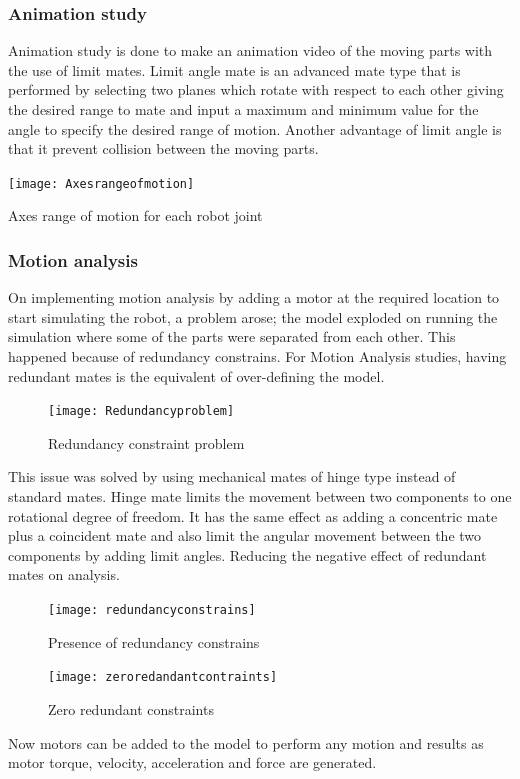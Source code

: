 \bigskip
\subsubsection{Animation study} 
Animation study is done to make an animation video of the moving parts with the use of limit mates. Limit angle mate is an advanced mate type that is performed by selecting two planes which rotate with respect to each other giving the desired range to mate and input a maximum and minimum value for the angle to specify the desired range of motion. Another advantage of limit angle is that it prevent collision between the moving parts.

\begin{table}[H]
	\centering
	\texttt{[image: Axesrangeofmotion]}
	\caption{Axes range of motion for each robot joint}
	\label{table:8}
\end{table}

\bigskip
\subsubsection{Motion analysis}
On implementing motion analysis by adding a motor at the required location to start simulating the robot, a problem arose; the model exploded on running the simulation where some of the parts were separated from each other. This happened because of redundancy constrains. For Motion Analysis studies, having redundant mates is the equivalent of over-defining the model.  

\begin{figure}[H]
	\centering
	\texttt{[image: Redundancyproblem]}
	\caption{Redundancy constraint problem}
\end{figure}

This issue was solved by using mechanical mates of hinge type instead of standard mates. Hinge mate limits the movement between two components to one rotational degree of freedom. It has the same effect as adding a concentric mate plus a coincident mate and also limit the angular movement between the two components by adding limit angles. Reducing the negative effect of redundant mates on analysis.

\begin{figure}[H]
	\centering
	\texttt{[image: redundancyconstrains]}
	\caption{Presence of redundancy constrains}
\end{figure}

\begin{figure}[H]
	\centering
	\texttt{[image: zeroredandantcontraints]}
	\caption{Zero redundant constraints}
\end{figure}
\smallskip
Now motors can be added to the model to perform any motion and results as motor torque, velocity, acceleration and force are generated.

